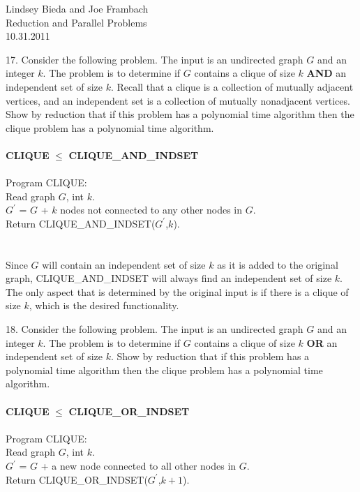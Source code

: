\documentclass[10pt]{article}
\newcommand{\tab}{\hspace*{2em}}
\begin{document}
	\begin{flushright}
	Lindsey Bieda and Joe Frambach\\
	Reduction and Parallel Problems\\
	10.31.2011
	\end{flushright}
	17. Consider the following problem. The input is an undirected graph $G$ and an integer $k$. The problem
	is to determine if $G$ contains a clique of size $k$ \textbf{AND} an independent set of size $k$. Recall that a
	clique is a collection of mutually adjacent vertices, and an independent set is a collection of mutually
	nonadjacent vertices. Show by reduction that if this problem has a polynomial time algorithm then
	the clique problem has a polynomial time algorithm.
	\\
	\\
	\textbf{CLIQUE} $\leq$ \textbf{CLIQUE\_AND\_INDSET}
	\\
	\\
	Program CLIQUE:\\
	\tab Read graph $G$, int $k$.\\
	\tab $G^\prime$ = $G$ + $k$ nodes not connected to any other nodes in $G$.\\
	\tab Return CLIQUE\_AND\_INDSET($G^\prime$,$k$).\\
	\\
	\\
	Since $G$ will contain an independent set of size $k$ as it is added to the original graph, CLIQUE\_AND\_INDSET 
	will always find an independent set of size $k$. The only aspect that is determined by the original input is if 
	there is a clique of size $k$, which is the desired functionality. 
	
	\newpage

	18. Consider the following problem. The input is an undirected graph $G$ and an integer $k$. The problem
	is to determine if $G$ contains a clique of size $k$ \textbf{OR} an independent set of size $k$. Show by reduction
	that if this problem has a polynomial time algorithm then the clique problem has a polynomial time
	algorithm.
	\\
	\\
	\textbf{CLIQUE} $\leq$ \textbf{CLIQUE\_OR\_INDSET}
	\\
	\\
	Program CLIQUE:\\
	\tab Read graph $G$, int $k$.\\
	\tab $G^\prime$ = $G$ + a new node connected to all other nodes in $G$.\\
	\tab Return CLIQUE\_OR\_INDSET($G^\prime$,$k + 1$).\\
\end{document}
